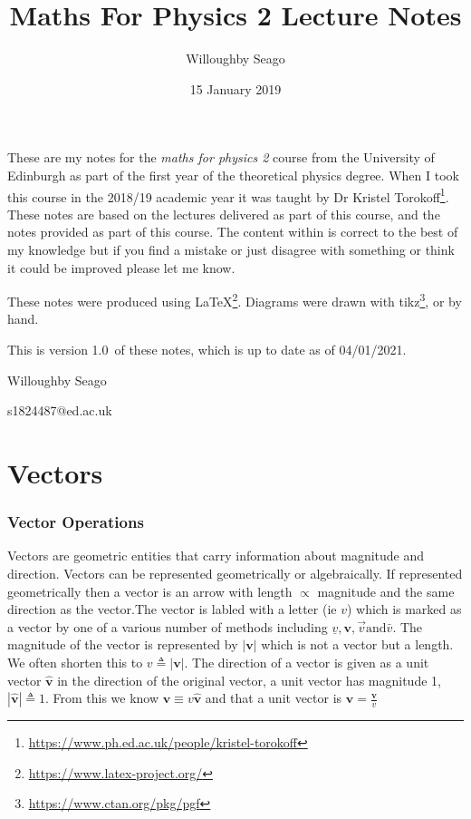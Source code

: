 \documentclass{article}
\title{Maths For Physics 2 Lecture Notes}
\author{Willoughby Seago}
\date{15 January 2019}
\renewcommand{\vec}[1]{\bm{#1}}
\newcommand{\notesVersion}{1.0}
\newcommand{\notesDate}{04/01/2021}
\begin{document}
\maketitle
These are my notes for the \textit{maths for physics 2} course from the University of Edinburgh as part of the first year of the theoretical physics degree.
When I took this course in the 2018/19 academic year it was taught by Dr Kristel Torokoff\footnote{\url{https://www.ph.ed.ac.uk/people/kristel-torokoff}}.
These notes are based on the lectures delivered as part of this course, and the notes provided as part of this course.
The content within is correct to the best of my knowledge but if you find a mistake or just disagree with something or think it could be improved please let me know.

These notes were produced using \LaTeX\footnote{\url{https://www.latex-project.org/}}.
Diagrams were drawn with tikz\footnote{\url{https://www.ctan.org/pkg/pgf}}, or by hand.

This is version \notesVersion~of these notes, which is up to date as of \notesDate.
\begin{flushright}
    Willoughby Seago
    
    s1824487@ed.ac.uk
\end{flushright}
\clearpage
\tableofcontents
\newpage

\part{Vectors}
\section{Vector Operations}


Vectors are geometric entities that carry information about magnitude and direction. Vectors can be represented geometrically or algebraically. If represented geometrically then a vector is an arrow with length \(\propto\) magnitude and the same direction as the vector.The vector is labled with a letter (ie \(v\)) which is marked as a vector by one of a various number of methods including \(\underline v, \mathbf v, \overrightarrow v \text{and} \bar v\). The magnitude of the vector is represented by \(|\vec v|\) which is not a vector but a length. We often shorten this to \(v\triangleq|\vec v|\). The direction of a vector is given as a unit vector \(\vec{\hat{v}}\) in the direction of the original vector, a unit vector has magnitude 1, \(|\vec{\hat{v}}|\triangleq 1\). From this we know \(\vec v\equiv v\vec{\hat{v}}\) and that a unit vector is \(\vec{\hat{v}}=\frac{\vec v}{v}\)
\end{document}
